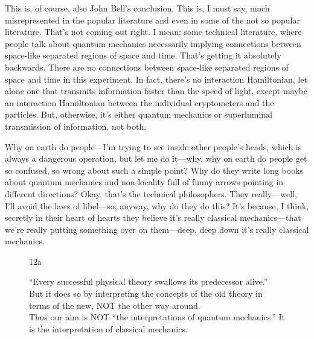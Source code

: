 \documentclass[twocolumn,prb]{revtex4}
\begin{document}
This is, of course, also John Bell's conclusion. This is, I must say, much misrepresented in the popular literature and even in some of the not so popular literature. That's not coming out right. I mean: some technical literature, where people talk about quantum mechanics necessarily implying connections between space-like separated regions of space and time. That's getting it absolutely backwards. There are no connections between space-like separated regions of space and time in this experiment. In fact, there's no interaction Hamiltonian, let alone one that transmits information faster than the speed of light, except maybe an interaction Hamiltonian between the individual cryptometers and the particles. But, otherwise, it's either quantum mechanics or superluminal transmission of information, not both.

Why on earth do people---I'm trying to see inside other people's heads, which is always a dangerous operation, but let me do it---why, why on earth do people get so confused, so wrong about such a simple point? Why do they write long books about quantum mechanics and non-locality full of funny arrows pointing in different directions? Okay, that's the technical philosophers. They really---well, I'll avoid the laws of libel---so, anyway, why do they do this? It's because, I think, secretly in their heart of hearts they believe it's really classical mechanics---that we're really putting something over on them---deep, deep down it's really classical mechanics.



\begin{figure}[htb] 
\begin{mdframed}
  \vspace{5pt}\hfill 12a\\ 
  \begin{raggedright}
    ``Every successful physical theory swallows its predecessor alive.''\\[\baselineskip]

    But it does so by interpreting the concepts of the old theory in terms of the new, NOT the other way around.\\[\baselineskip]

    Thus our aim is NOT ``the interpretations of quantum mechanics.''  It is the interpretation of classical mechanics.\\[\baselineskip]
  \end{raggedright}
\vspace{-.5\baselineskip}
\end{mdframed}
\end{figure}
\end{document}
